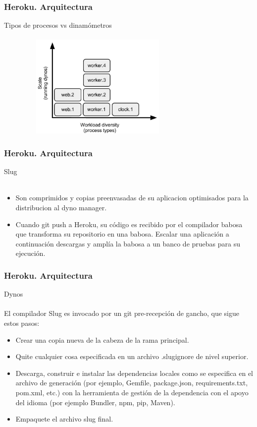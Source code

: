 \documentclass{beamer}
\begin{document}
\begin{frame}
	\frametitle{Heroku. Arquitectura}
	\centering Tipos de procesos vs dinamómetros\\ \ \\
	\includegraphics[width=10cm,height=5cm]{arquitectura/tipodeproceso.jpg}
\end{frame}

\begin{frame}
		\frametitle{Heroku. Arquitectura}
	\centering Slug\\ \ \\
	\begin{itemize}
		\item Son comprimidos y copias preenvasadas de su aplicacion optimisados para la distribucion al dyno manager.
		\item Cuando git push a Heroku, su código es recibido por el compilador babosa que transforma su repositorio en una babosa. Escalar una aplicación a continuación descargas y amplía la babosa a un banco de pruebas para su ejecución.
	\end{itemize}
\end{frame}

\begin{frame}
		\frametitle{Heroku. Arquitectura}
	\centering Dynos\\ \ \\
	El compilador Slug es invocado por un git pre-recepción de gancho, que sigue estos pasos:
	\begin{itemize}
		\item Crear una copia nueva de la cabeza de la rama principal. 
		\item Quite cualquier cosa especificada en un archivo .slugignore de nivel superior. 
		\item Descarga, construir e instalar las dependencias locales como se especifica en el archivo de generación (por ejemplo, Gemfile, package.json, requirements.txt, pom.xml, etc.) con la herramienta de gestión de la dependencia con el apoyo del idioma (por ejemplo Bundler, npm, pip, Maven). 
		\item Empaquete el archivo slug final.
	\end{itemize}
\end{frame}
\end{document}
